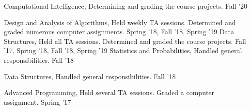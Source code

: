 



\begin{cvtas}

  \cvta
    {Computational Intelligence, } %
    {Determining and grading the course projects.} %
    {Fall '20} %
    {} %

  \cvta
    {Design and Analysis of Algorithms, } %
    {Held weekly TA sessions. Determined and graded numerous computer assignments.} %
    {Spring '18, Fall '18, Spring '19} %
    {} %
  \cvta
    {Data Structures, } %
    {Held all TA sessions. Determined and graded the course projects.} %
    {Fall '17, Spring '18, Fall '18, Spring '19} %
    {} %
  \cvta
    {Statistics and Probabilities, } %
    {Handled general responsibilities.} %
    {Fall '18} %
    {} %

  \cvta
    {Data Structures, } %
    {Handled general responsibilities.} %
    {Fall '18} %
    {} %

  \cvta
    {Advanced Programming, } %
    {Held several TA sessions. Graded a computer assignment.} %
    {Spring '17} %
    {} %


\end{cvtas}

